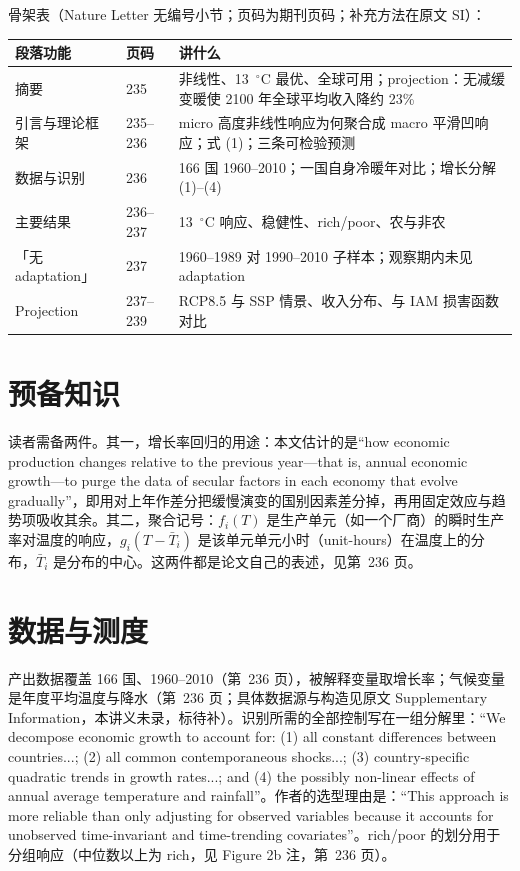骨架表（Nature Letter 无编号小节；页码为期刊页码；补充方法在原文 SI）：

\begin{table}[htbp]
\centering\small
\begin{tabular}{@{}p{3.4cm}p{1.4cm}p{8.0cm}@{}}
\toprule
段落功能 & 页码 & 讲什么 \\
\midrule
摘要 & 235 & 非线性、13~$^\circ$C 最优、全球可用；projection：无减缓变暖使 2100 年全球平均收入降约 23\% \\
引言与理论框架 & 235--236 & micro 高度非线性响应为何聚合成 macro 平滑凹响应；式 (1)；三条可检验预测 \\
数据与识别 & 236 & 166 国 1960--2010；一国自身冷暖年对比；增长分解 (1)--(4) \\
主要结果 & 236--237 & 13~$^\circ$C 响应、稳健性、rich/poor、农与非农 \\
「无 adaptation」 & 237 & 1960--1989 对 1990--2010 子样本；观察期内未见 adaptation \\
Projection & 237--239 & RCP8.5 与 SSP 情景、收入分布、与 IAM 损害函数对比 \\
\bottomrule
\end{tabular}
\end{table}

\section{预备知识}

读者需备两件。其一，增长率回归的用途：本文估计的是``how economic production changes relative to the previous year—that is, annual economic growth—to purge the data of secular factors in each economy that evolve gradually''\citep[第~236 页]{burke2015global}，即用对上年作差分把缓慢演变的国别因素差分掉，再用固定效应与趋势项吸收其余。其二，聚合记号：$f_i(T)$ 是生产单元（如一个厂商）的瞬时生产率对温度的响应，$g_i(T-\bar{T}_i)$ 是该单元单元小时（unit-hours）在温度上的分布，$\bar T_i$ 是分布的中心。这两件都是论文自己的表述，见第~236 页。

\section{数据与测度}

产出数据覆盖 166 国、1960--2010（第~236 页），被解释变量取增长率；气候变量是年度平均温度与降水（第~236 页；具体数据源与构造见原文 Supplementary Information，本讲义未录，标待补）。识别所需的全部控制写在一组分解里：``We decompose economic growth to account for: (1) all constant differences between countries...; (2) all common contemporaneous shocks...; (3) country-specific quadratic trends in growth rates...; and (4) the possibly non-linear effects of annual average temperature and rainfall''\citep[第~236 页]{burke2015global}。作者的选型理由是：``This approach is more reliable than only adjusting for observed variables because it accounts for unobserved time-invariant and time-trending covariates''\citep[第~236 页]{burke2015global}。rich/poor 的划分用于分组响应（中位数以上为 rich，见 Figure 2b 注，第~236 页）。


